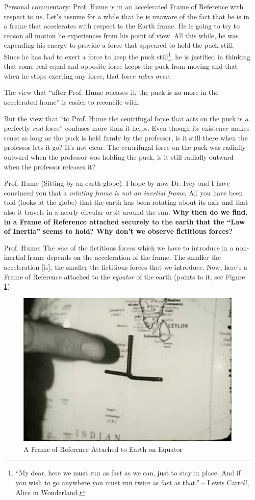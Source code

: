 \documentclass[a6paper]{article}
\newcommand{\perscom}[1]{
    {\footnotesize Personal commentary:  #1}
}
\begin{document}
\perscom {
    Prof. Hume is in an accelerated Frame of Reference with respect to us. Let's assume for a while that he is unaware of the fact that he is in a frame that accelerates with respect to the Earth frame. He is going to try to reason all motion he experiences from his point of view. All this while, he was expending his energy to provide a force that appeared to hold the puck still. Since he has had to exert a force to keep the puck still\footnote{``My dear, here we must run as fast as we can, just to stay in place. And if you wish to go anywhere you must run twice as fast as that.'' -- Lewis Carroll, Alice in Wonderland.}, he is justified in thinking that some real equal and opposite force keeps the puck from moving and that when he stops exerting any force, that force \emph{takes over}. 

    The view that ``after Prof. Hume releases it, the puck is no more in the accelerated frame'' is easier to reconcile with. 
    
    But the view that ``to Prof. Hume the centrifugal force that acts on the puck is a perfectly \emph{real} force'' confuses more than it helps. Even though its existence makes sense as long as the puck is held firmly by the professor, is it still there when the professor lets it go? It's not clear. The centrifugal force on the puck was radially outward when the professor was holding the puck, is it still radially outward when the professor releases it? 
    
}

Prof. Hume (Sitting by an earth globe): I hope by now Dr. Ivey and I have convinced you that a \emph{rotating frame is not an inertial frame}. All you have been told (looks at the globe)  that the earth has been rotating about its axis and that also it travels in a nearly circular orbit around the sun. \textbf{Why then do we find, in a Frame of Reference attached securely to the earth that the ``Law of Inertia'' seems to hold? Why don't we observe fictitious forces?}

Prof. Hume: The \emph{size} of the fictitious forces which we have to introduce in a non-inertial frame depends on the acceleration of the frame. The smaller the acceleration [is], the smaller the fictitious forces that we introduce. Now, here's a Frame of Reference attached to the \emph{equator} of the earth (points to it; see Figure \ref{fig: frame-of-ref-attached-to-the-equator}).
        \begin{figure}[h!]
            \centering
            \includegraphics[width=0.5\linewidth]{frame-of-ref-attached-to-earth.png}
            \caption{A Frame of Reference Attached to Earth on Equator}
            \label{fig: frame-of-ref-attached-to-the-equator}
        \end{figure}
\end{document}
